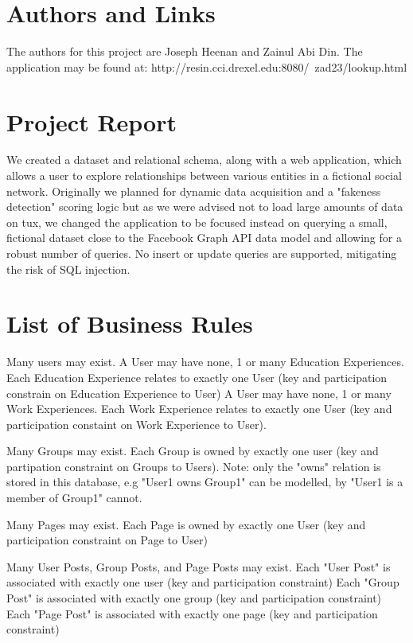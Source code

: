 \documentclass{article}
\begin{document}
\section{Authors and Links}

The authors for this project are Joseph Heenan and Zainul Abi Din. The application may be found at: http://resin.cci.drexel.edu:8080/~zad23/lookup.html

\section{Project Report}

We created a dataset and relational schema, along with a web application, which allows a user to explore relationships between various entities in a fictional social network. Originally we planned for dynamic data acquisition and a "fakeness detection" scoring logic but as we were advised not to load large amounts of data on tux, we changed the application to be focused instead on querying a small, fictional dataset close to the Facebook Graph API data model and allowing for a robust number of queries. No insert or update queries are supported, mitigating the risk of SQL injection.

\section{List of Business Rules}

Many users may exist.
A User may have none, 1 or many Education Experiences. Each Education Experience relates to exactly one User (key and participation constrain on Education Experience to User)
A User may have none, 1 or many Work Experiences. Each Work Experience relates to exactly one User (key and participation constaint on Work Experience to User).

Many Groups may exist. Each Group is owned by exactly one user (key and partipation constraint on Groups to Users). Note: only the "owns" relation is stored in this database, e.g "User1 owns Group1" can be modelled, by "User1 is a member of Group1" cannot.

Many Pages may exist. Each Page is owned by exactly one User (key and participation constraint on Page to User)

Many User Posts, Group Posts, and Page Posts may exist.
Each "User Post" is associated with exactly one user (key and participation constraint)
Each "Group Post" is associated with exactly one group (key and participation constraint)
Each "Page Post" is associated with exactly one page (key and participation constraint)
\end{document}
